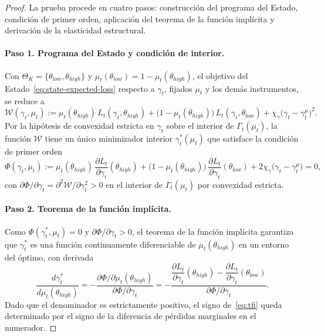 \documentclass[12pt]{article}
\theoremstyle{definition}
\theoremstyle{remark}
\newcommand{\1}{\mathbf{1}}
\begin{document}
\begin{proof}
La prueba procede en cuatro pasos: construcción del programa del Estado,
condición de primer orden, aplicación del teorema de la función implícita
y derivación de la elasticidad estructural.

\paragraph{Paso 1. Programa del Estado y condición de interior.}
Con $\Theta_K=\{\theta_{low},\theta_{high}\}$ y
$\mu_t(\theta_{low})=1-\mu_t(\theta_{high})$, el objetivo del
Estado~\eqref{eq:state-expected-loss} respecto a $\gamma_t$, fijados $\mu_t$
y los demás instrumentos, se reduce a
\begin{equation}
\label{eq:obj-gamma}
\mathcal{W}(\gamma_t,\mu_t)
:= \mu_t(\theta_{high})\,L_t(\gamma_t,\theta_{high})
 + \bigl(1-\mu_t(\theta_{high})\bigr)\,L_t(\gamma_t,\theta_{low})
 + \chi_\gamma\bigl(\gamma_t-\gamma_t^\mu\bigr)^2.
\end{equation}
Por la hipótesis de convexidad estricta en $\gamma_t$ sobre el interior de
$\Gamma_t(\mu_t)$, la función $\mathcal{W}$ tiene un único minimizador interior
$\gamma_t^\ast(\mu_t)$ que satisface la condición de primer orden
\begin{equation}
\label{eq:foc-gamma}
\Phi(\gamma_t,\mu_t)
:= \mu_t(\theta_{high})\,\frac{\partial L_t}{\partial\gamma_t}(\theta_{high})
 + \bigl(1-\mu_t(\theta_{high})\bigr)\,
   \frac{\partial L_t}{\partial\gamma_t}(\theta_{low})
 + 2\chi_\gamma\bigl(\gamma_t-\gamma_t^\mu\bigr)
= 0,
\end{equation}
con $\partial\Phi/\partial\gamma_t = \partial^2\mathcal{W}/\partial\gamma_t^2 > 0$
en el interior de $\Gamma_t(\mu_t)$ por convexidad estricta.

\paragraph{Paso 2. Teorema de la función implícita.}
Como $\Phi(\gamma_t^\ast,\mu_t)=0$ y $\partial\Phi/\partial\gamma_t>0$,
el teorema de la función implícita garantiza que $\gamma_t^\ast$ es una función
continuamente diferenciable de $\mu_t(\theta_{high})$ en un entorno del óptimo,
con derivada
\begin{equation}
\label{eq:tfi}
\frac{d\gamma_t^\ast}{d\mu_t(\theta_{high})}
= -\frac{\partial\Phi/\partial\mu_t(\theta_{high})}
        {\partial\Phi/\partial\gamma_t}
= -\frac{
    \dfrac{\partial L_t}{\partial\gamma_t}(\theta_{high})
    -\dfrac{\partial L_t}{\partial\gamma_t}(\theta_{low})
  }{
    \partial\Phi/\partial\gamma_t
  }.
\end{equation}
Dado que el denominador es estrictamente positivo, el signo de~\eqref{eq:tfi}
queda determinado por el signo de la diferencia de pérdidas marginales en el
numerador.


\end{proof}
\end{document}
